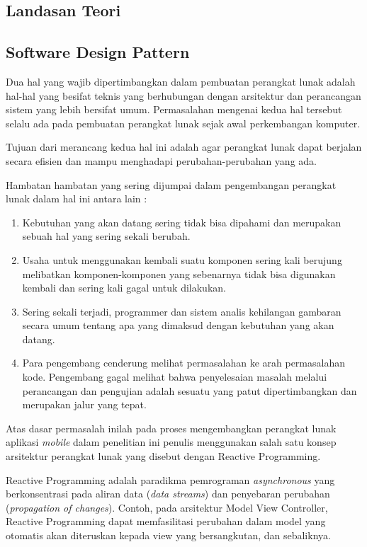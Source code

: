 \begin{spacing}{2}
\section{Landasan Teori}
  \subsection{Software Design Pattern}
    Dua hal yang wajib dipertimbangkan dalam pembuatan perangkat lunak adalah hal-hal yang besifat teknis yang berhubungan dengan arsitektur dan perancangan sistem yang lebih bersifat umum. Permasalahan mengenai kedua hal tersebut selalu ada pada pembuatan perangkat lunak sejak awal perkembangan komputer.

    Tujuan dari merancang kedua hal ini adalah agar perangkat lunak dapat berjalan secara efisien dan mampu menghadapi perubahan-perubahan yang ada.

    Hambatan hambatan yang sering dijumpai dalam pengembangan perangkat lunak dalam hal ini antara lain :
    \begin{enumerate}
      \item Kebutuhan yang akan datang sering tidak bisa dipahami dan merupakan sebuah hal yang sering sekali berubah.
      \item Usaha untuk menggunakan kembali suatu komponen sering kali berujung melibatkan komponen-komponen yang sebenarnya tidak bisa digunakan kembali dan sering kali gagal untuk dilakukan.
      \item Sering sekali terjadi, programmer dan sistem analis kehilangan gambaran secara umum tentang apa yang dimaksud dengan kebutuhan yang akan datang.
      \item Para pengembang cenderung melihat permasalahan ke arah permasalahan kode. Pengembang gagal melihat bahwa penyelesaian masalah melalui perancangan dan pengujian adalah sesuatu yang patut dipertimbangkan dan merupakan jalur yang tepat.
    \end{enumerate}

    Atas dasar permasalah inilah pada proses mengembangkan perangkat lunak aplikasi \emph{mobile} dalam penelitian ini penulis menggunakan salah satu konsep arsitektur perangkat lunak yang disebut dengan Reactive Programming.

    Reactive Programming adalah paradikma pemrograman \emph{asynchronous} yang berkonsentrasi pada aliran data (\emph{data streams}) dan penyebaran perubahan (\emph{propagation of changes}). Contoh, pada arsitektur Model View Controller, Reactive Programming dapat memfasilitasi perubahan dalam model yang otomatis akan diteruskan kepada view yang bersangkutan, dan sebaliknya.


\end{spacing}
